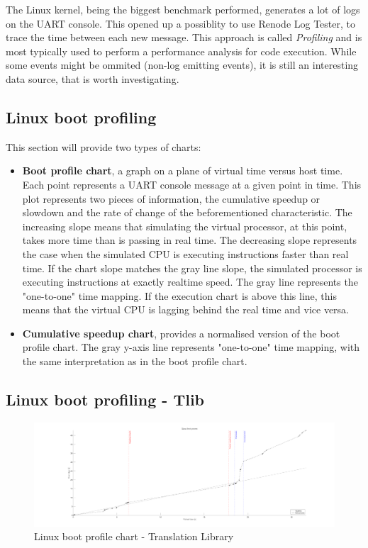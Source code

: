\noindent
The Linux kernel, being the biggest benchmark performed, generates a lot of logs on the UART console. This opened up a
possiblity to use Renode Log Tester, to trace the time between each new message. This approach is called
\textit{Profiling} and is most typically used to perform a performance analysis for code execution. While some events
might be ommited (non-log emitting events), it is still an interesting data source, that is worth investigating.

\pagebreak

\subsection{Linux boot profiling}
This section will provide two types of charts:
\begin{itemize}
    \item{\textbf{Boot profile chart}, a graph on a plane of virtual time versus host time. Each point represents a
    UART console message at a given point in time. This plot represents two pieces of information, the cumulative
    speedup or slowdown and the rate of change of the beforementioned characteristic. The increasing slope means that
    simulating the virtual processor, at this point, takes more time than is passing in real time. The decreasing slope
    represents the case when the simulated CPU is executing instructions faster than real time. If the chart slope
    matches the gray line slope, the simulated processor is executing instructions at exactly realtime speed.
    The gray line represents the "one-to-one" time mapping. If the execution chart is above this line, this means
    that the virtual CPU is lagging behind the real time and vice versa.}
    \item{\textbf{Cumulative speedup chart}, provides a normalised version of the boot profile chart.
    The gray y-axis line represents "one-to-one" time mapping, with the same interpretation as in the boot profile
    chart.}
\end{itemize}

\pagebreak

\subsection*{Linux boot profiling - Tlib}
\begin{figure}[h]
	\centering
    \hspace*{-2cm}
	\includegraphics[width=1.2\textwidth]{figures/benchmarks/linux_boot/adnotated/TlibBoot.pdf}
	\caption{Linux boot profile chart - Translation Library}
\end{figure}

